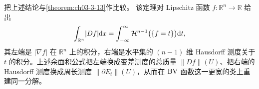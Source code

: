 \documentclass[../../main.tex]{subfiles}%
\begin{document}
\begin{remark}\label{remark:ch05-thm-5-9-比较}
把上述结论与\cref{theorem:ch03-3-13}作比较。%
该定理对 Lipschitz 函数 $f:\mathbb{R}^n\to\mathbb{R}$ 给出
\begin{align*}
\int_{\mathbb{R}^n}\lvert Df\rvert\mathrm{d} x=\int_{-\infty}^{\infty}\mathcal{H}^{n-1}\bigl(\{f=t\}\bigr)\mathrm{d} t,
\end{align*}
其左端是 $\lvert\nabla f\rvert$ 在 $\mathbb{R}^n$ 上的积分，右端是水平集的 $(n-1)$ 维 Hausdorff 测度关于 $t$ 的积分。上述余面积公式把左端换成变差测度的总质量 $\lVert Df\rVert(U)$、把右端的 Hausdorff 测度换成周长测度 $\lVert\partial E_t\rVert(U)$，从而在 $\mathrm{BV}$ 函数这一更宽的类上重建同一分解。
\end{remark}
\end{document}
